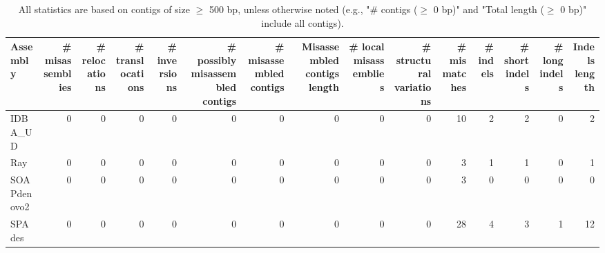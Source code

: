 \documentclass[12pt,a4paper]{article}
\begin{document}
\begin{table}[ht]
\begin{center}
\caption{All statistics are based on contigs of size $\geq$ 500 bp, unless otherwise noted (e.g., "\# contigs ($\geq$ 0 bp)" and "Total length ($\geq$ 0 bp)" include all contigs).}
\begin{tabular}{|l*{14}{|r}|}
\hline
Assembly & \# misassemblies &     \# relocations &     \# translocations &     \# inversions & \# possibly misassembled contigs & \# misassembled contigs & Misassembled contigs length & \# local misassemblies & \# structural variations & \# mismatches & \# indels &     \# short indels &     \# long indels & Indels length \\ \hline
IDBA\_UD & 0 & 0 & 0 & 0 & 0 & 0 & 0 & 0 & 0 & 10 & 2 & 2 & 0 & 2 \\ \hline
Ray & 0 & 0 & 0 & 0 & 0 & 0 & 0 & 0 & 0 & 3 & 1 & 1 & 0 & 1 \\ \hline
SOAPdenovo2 & 0 & 0 & 0 & 0 & 0 & 0 & 0 & 0 & 0 & 3 & 0 & 0 & 0 & 0 \\ \hline
SPAdes & 0 & 0 & 0 & 0 & 0 & 0 & 0 & 0 & 0 & 28 & 4 & 3 & 1 & 12 \\ \hline
\end{tabular}
\end{center}
\end{table}
\end{document}
